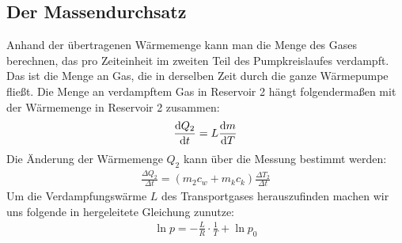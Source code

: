 \subsection{Der Massendurchsatz \cite[vgl.][]{man:v206}}
Anhand der übertragenen Wärmemenge kann man die Menge des Gases berechnen, das pro Zeiteinheit
im zweiten Teil des Pumpkreislaufes verdampft.
Das ist die Menge an Gas, die in derselben Zeit durch die ganze Wärmepumpe fließt.
Die Menge an verdampftem Gas in Reservoir 2 hängt folgendermaßen mit der Wärmemenge in Reservoir 2 zusammen:
\begin{align}
    \frac{\mathop{}\!\mathrm{d} Q_2}{\mathop{}\!\mathrm{d} t} = L \frac{\mathop{}\!\mathrm{d} m}{\mathop{}\!\mathrm{d} T}
\end{align} 
Die Änderung der Wärmemenge $ Q_2$ kann über die Messung bestimmt werden:
\begin{align}
    \frac{\Delta Q_2}{\Delta t} = (m_2 c_w + m_k c_k) \frac{\Delta T_2}{\Delta t}
\end{align} 
Um die Verdampfungswärme $L$ des Transportgases herauszufinden machen wir uns folgende in \cite[][5]{man:v203} hergeleitete
Gleichung zunutze:
\begin{align}
    \ln{p} = -\frac{L}{R}\cdot \frac{1}{T} + \ln{p_0}
\end{align}
